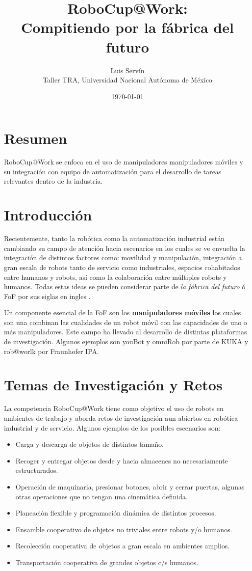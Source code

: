 \documentclass[12pt]{article}
\title{\vspace{-4ex}RoboCup@Work:\\Compitiendo por la fábrica del futuro\vspace{-2ex}}
\date{\today}
\author{Luis Servín\\ Taller TRA, Universidad Nacional Autónoma de México}
\begin{document}
\maketitle

\section*{Resumen}

RoboCup@Work se enfoca en el uso de manipuladores manipuladores móviles y su integración con equipo de automatización para el desarrollo de tareas relevantes dentro de la industria.

\section{Introducción}

Recientemente, tanto la robótica como la automatización industrial están cambiando su campo de atención hacia escenarios en los cuales se ve envuelta la integración de distintos factores como: movilidad y manipulación, integración a gran escala de robots tanto de servicio como industriales, espacios cohabitados entre humanos y robots, así como la colaboración entre múltiples robots y humanos. Todas estas ideas se pueden considerar parte de \emph{la fábrica del futuro} ó FoF por sus siglas en ingles \cite{tapas2013}.

Un componente esencial de la FoF son los \textbf{manipuladores móviles} los cuales son una combinan las cualidades de un robot móvil con las capacidades de uno o más manipuladores. Este campo ha llevado al desarrollo de distintas plataformas de investigación. Algunos ejemplos son youBot \cite{bischoff2011kuka} y omniRob por parte de KUKA y rob@worlk por  Fraunhofer IPA.

\section{Temas de Investigación y Retos}

La competencia RoboCup@Work tiene como objetivo el uso de robots en ambientes de trabajo y aborda retos de investigación aun abiertos en robótica industrial y de servicio. Algunos ejemplos de los posibles escenarios son:

\begin{itemize}[noitemsep]
	\item Carga y descarga de objetos de distintos tamaño.
	\item Recoger y entregar objetos desde y hacia almacenes no necesariamente estructurados.
	\item Operación de maquinaria, presionar botones, abrir y cerrar puertas, algunas otras operaciones que no tengan una cinemática definida.
	\item Planeación flexible y programación dinámica de distintos procesos.
	\item Ensamble cooperativo de objetos no triviales entre robots y/o humanos.
	\item Recolección cooperativa de objetos a gran escala en ambientes amplios.
	\item Transportación cooperativa de grandes objetos c/s humanos.
\end{itemize}
\end{document}
